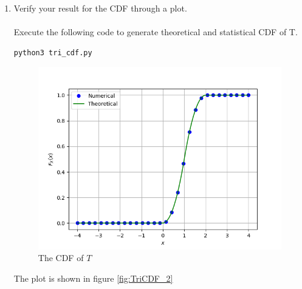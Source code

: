 \documentclass[journal,12pt,twocolumn]{IEEEtran}
\renewcommand\thesection{\arabic{section}}
\begin{document}
\begin{enumerate}[label=\thesection.\arabic*
,ref=\thesection.\theenumi]
\item
	Verify your result for the CDF through a plot.
	\\
	\solution
	\\
	Execute the following code to generate theoretical and statistical CDF of T.
	\begin{lstlisting}
python3 tri_cdf.py
	\end{lstlisting}
	\begin{figure}
	\centering
	\includegraphics[width=\columnwidth]{../figs/tri_cdf_comp.png}
	\caption{The CDF of $T$}
	\label{fig:TriCDF_2}
	\end{figure}
	
	The plot is shown in figure \eqref{fig:TriCDF_2}

\end{enumerate}
\end{document}

